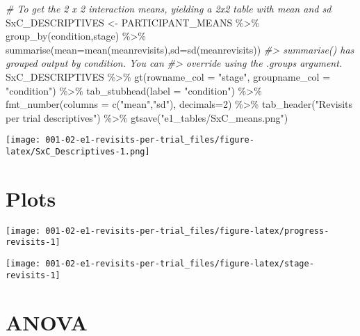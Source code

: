 \documentclass[
]{book}
\newenvironment{Shaded}{\begin{snugshade}}{\end{snugshade}}
\newcommand{\AttributeTok}[1]{\textcolor[rgb]{0.77,0.63,0.00}{#1}}
\newcommand{\CommentTok}[1]{\textcolor[rgb]{0.56,0.35,0.01}{\textit{#1}}}
\newcommand{\DecValTok}[1]{\textcolor[rgb]{0.00,0.00,0.81}{#1}}
\newcommand{\FunctionTok}[1]{\textcolor[rgb]{0.00,0.00,0.00}{#1}}
\newcommand{\NormalTok}[1]{#1}
\newcommand{\OtherTok}[1]{\textcolor[rgb]{0.56,0.35,0.01}{#1}}
\newcommand{\SpecialCharTok}[1]{\textcolor[rgb]{0.00,0.00,0.00}{#1}}
\newcommand{\StringTok}[1]{\textcolor[rgb]{0.31,0.60,0.02}{#1}}
\theoremstyle{definition}
\theoremstyle{definition}
\theoremstyle{definition}
\theoremstyle{definition}
\theoremstyle{remark}
\begin{document}
\begin{Shaded}
\begin{Highlighting}[]
\CommentTok{\# To get the 2 x 2 interaction means, yielding a 2x2 table with mean and sd}
\NormalTok{SxC\_DESCRIPTIVES }\OtherTok{\textless{}{-}}\NormalTok{ PARTICIPANT\_MEANS }\SpecialCharTok{\%\textgreater{}\%} \FunctionTok{group\_by}\NormalTok{(condition,stage) }\SpecialCharTok{\%\textgreater{}\%} \FunctionTok{summarise}\NormalTok{(}\AttributeTok{mean=}\FunctionTok{mean}\NormalTok{(meanrevisits),}\AttributeTok{sd=}\FunctionTok{sd}\NormalTok{(meanrevisits))}
\CommentTok{\#\textgreater{} \textasciigrave{}summarise()\textasciigrave{} has grouped output by \textquotesingle{}condition\textquotesingle{}. You can}
\CommentTok{\#\textgreater{} override using the \textasciigrave{}.groups\textasciigrave{} argument.}
\NormalTok{SxC\_DESCRIPTIVES }\SpecialCharTok{\%\textgreater{}\%} 
  \FunctionTok{gt}\NormalTok{(}\AttributeTok{rowname\_col =} \StringTok{"stage"}\NormalTok{, }\AttributeTok{groupname\_col =} \StringTok{"condition"}\NormalTok{) }\SpecialCharTok{\%\textgreater{}\%} 
  \FunctionTok{tab\_stubhead}\NormalTok{(}\AttributeTok{label =} \StringTok{"condition"}\NormalTok{) }\SpecialCharTok{\%\textgreater{}\%} 
  \FunctionTok{fmt\_number}\NormalTok{(}\AttributeTok{columns =} \FunctionTok{c}\NormalTok{(}\StringTok{"mean"}\NormalTok{,}\StringTok{"sd"}\NormalTok{), }\AttributeTok{decimals=}\DecValTok{2}\NormalTok{) }\SpecialCharTok{\%\textgreater{}\%} 
  \FunctionTok{tab\_header}\NormalTok{(}\StringTok{"Revisits per trial descriptives"}\NormalTok{) }\SpecialCharTok{\%\textgreater{}\%} 
  \FunctionTok{gtsave}\NormalTok{(}\StringTok{"e1\_tables/SxC\_means.png"}\NormalTok{)}
\end{Highlighting}
\end{Shaded}

\texttt{[image: 001-02-e1-revisits-per-trial\_files/figure-latex/SxC\_Descriptives-1.png]}

\hypertarget{plots}{%
\section{Plots}\label{plots}}

\texttt{[image: 001-02-e1-revisits-per-trial\_files/figure-latex/progress-revisits-1]}

\texttt{[image: 001-02-e1-revisits-per-trial\_files/figure-latex/stage-revisits-1]}

\hypertarget{anova}{%
\section{ANOVA}\label{anova}}
\end{document}
